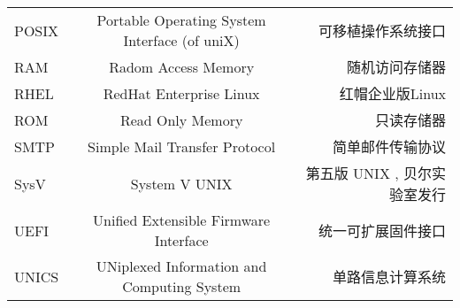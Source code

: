 \begin{landscape}
\begin{center}
\begin{supertabular}{l|c|r}
POSIX & Portable Operating System Interface (of uniX) & 可移植操作系统接口 \\
RAM & Radom Access Memory & 随机访问存储器\\
RHEL & RedHat Enterprise Linux & 红帽企业版Linux\\
ROM & Read Only Memory & 只读存储器\\
SMTP & Simple Mail Transfer Protocol & 简单邮件传输协议 \\


SysV & System V UNIX & 第五版 UNIX , 贝尔实验室发行 \\
UEFI & Unified Extensible Firmware Interface & 统一可扩展固件接口 \\
UNICS & UNiplexed Information and Computing System & 单路信息计算系统\\
\end{supertabular}
\end{center}
\end{landscape}